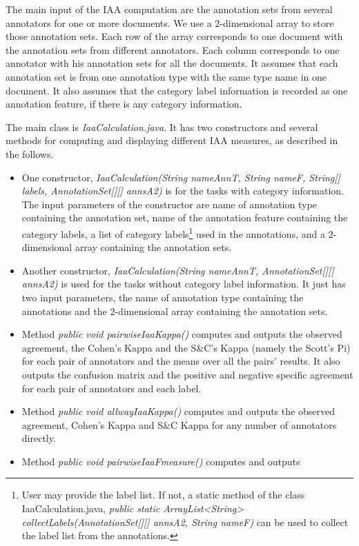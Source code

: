 The main input of the IAA computation are the annotation sets from several annotators
for one or more documents. We use a 2-dimensional array to store those annotation sets.
Each row of the array corresponds to one document with the annotation sets from different
annotators. Each column corresponds to one annotator with his annotation sets for
all the documents. It assumes that each annotation set is from one annotation type with
the same type name in one document. It also assumes that the category label information 
is recorded as one annotation feature, if there is any category information.

The main class is {\em IaaCalculation.java}. It has two constructors and several methods
for computing and displaying different IAA measures, as described in the follows.
\begin{itemize}
\item One constructor,
{\em IaaCalculation(String nameAnnT, String nameF, String[] labels,
    AnnotationSet[][] annsA2)}
is for the
tasks with category information. The input parameters of the constructor are name of 
annotation type containing the annotation set, name of the annotation feature containing
the category labels, a list of category labels\footnote{User may provide the label list. 
If not, a static method of the class IaaCalculation.java, 
{\em public static ArrayList<String> collectLabels(AnnotationSet[][] annsA2, String nameF)}
can be used to collect the label list from the annotations.} used in the annotations, 
and a 2-dimensional array containing the annotation sets.
\item Another constructor, {\em IaaCalculation(String nameAnnT, AnnotationSet[][] annsA2)}
is used for the tasks without category label information. It just has two input parameters,
the name of annotation type containing the annotations and the 2-dimensional array containing
the annotation sets.
\item Method {\em public void pairwiseIaaKappa()} computes and outputs the 
observed agreement, the
 Cohen's Kappa and the S\&C's Kappa (namely the Scott's Pi) for each pair of annotators and
the means over all the pairs' results. It also outputs the confusion matrix and the 
positive and negative specific agreement for each pair
of annotators and each label.
\item Method {\em public void allwayIaaKappa()} computes and outputs the 
observed agreement, Cohen's  Kappa and S\&C Kappa for any number of annotators directly.
\item Method {\em public void pairwiseIaaFmeasure()} computes and outputs 

\end{itemize}
